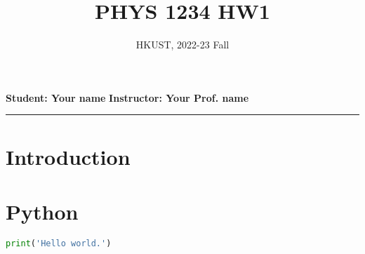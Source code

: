 \documentclass[a4paper, 12pt]{article}
\title{\textbf{PHYS 1234 HW1}}
\author{HKUST, 2022-23 Fall}
\date{\vspace{-5ex}}
\begin{document}
	\maketitle
	
	\begin{center}
		\textbf{Student: Your name}
		\hfill
		\textbf{Instructor: Your Prof. name} 
		\rule{16.5cm}{1pt}
	\end{center}
	
	\section*{Introduction}
	\lipsum[1]
	\section{Python}
	\begin{lstlisting}[language=Python, caption=Python]
		print('Hello world.')
	\end{lstlisting}
	
\end{document}
